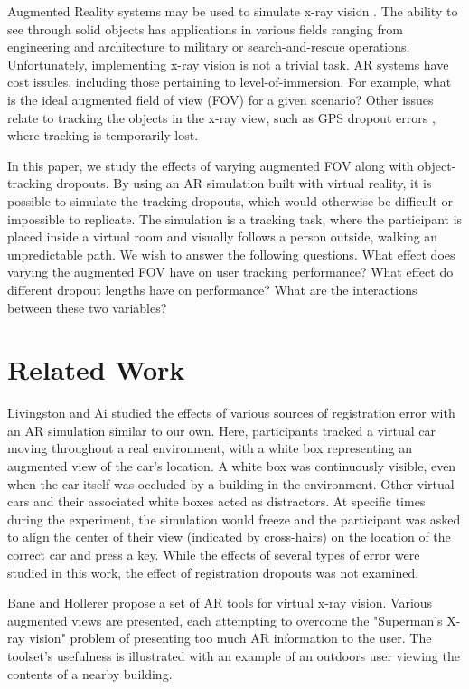 \documentclass{acmsiggraph}                     %
\begin{document}

Augmented Reality systems may be used to simulate x-ray vision \cite{1383060}.  The ability to see through solid objects has applications in various fields ranging from engineering and architecture to military or search-and-rescue operations.  Unfortunately, implementing x-ray vision is not a trivial task.  AR systems have cost issules, including those pertaining to level-of-immersion.  For example, what is the ideal augmented field of view (FOV) for a given scenario?  Other issues relate to tracking the objects in the x-ray view, such as GPS dropout errors \cite{4079263}, where tracking is temporarily lost.

In this paper, we study the effects of varying augmented FOV along with object-tracking dropouts.  By using an AR simulation built with virtual reality, it is possible to simulate the tracking dropouts, which would otherwise be difficult or impossible to replicate.  The simulation is a tracking task, where the participant is placed inside a virtual room and visually follows a person outside, walking an unpredictable path.  We wish to answer the following questions.  What effect does varying the augmented FOV have on user tracking performance?  What effect do different dropout lengths have on performance?  What are the interactions between these two variables?

\section{Related Work}

Livingston and Ai \cite{4637329} studied the effects of various sources of registration error with an AR simulation similar to our own.  Here, participants tracked a virtual car moving throughout a real environment, with a white box representing an augmented view of the car's location.  A white box was continuously visible, even when the car itself was occluded by a building in the environment.  Other virtual cars and their associated white boxes acted as distractors.  At specific times during the experiment, the simulation would freeze and the participant was asked to align the center of their view (indicated by cross-hairs) on the location of the correct car and press a key.  While the effects of several types of error were studied in this work, the effect of registration dropouts was not examined.

Bane and Hollerer \cite{1383060} propose a set of AR tools for virtual x-ray vision.  Various augmented views are presented, each attempting to overcome the "Superman's X-ray vision" problem of presenting too much AR information to the user.  The toolset's usefulness is illustrated with an example of an outdoors user viewing the contents of a nearby building.
\end{document}
